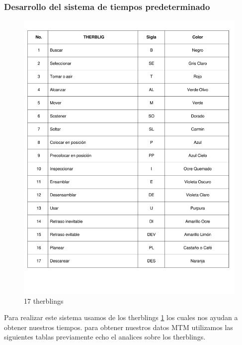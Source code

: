     \subsubsection{Desarrollo del sistema de tiempos predeterminado}
    \begin{figure}[H]
        \centering
        \includegraphics[scale=0.40]{13/img/tablaTherbling.pdf}
        \caption{17 therblings}
        \label{fig:therblings}
    \end{figure}
    Para realizar este sistema usamos de los therblings \ref{fig:therblings} los cuales nos ayudan a obtener nuestros tiempos.
    para obtener nuestros datos MTM utilizamos las siguientes tablas previamente echo el analices sobre los therblings.
